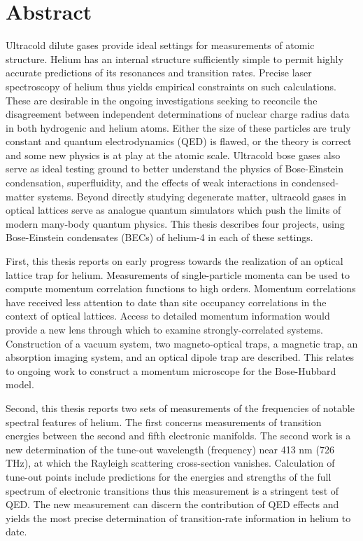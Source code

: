 \section*{Abstract}

Ultracold dilute gases provide ideal settings for measurements of atomic structure. 
Helium has an internal structure sufficiently simple to permit highly accurate predictions of its resonances and transition rates.
Precise laser spectroscopy of helium thus yields empirical constraints on such calculations.
These are desirable in the ongoing investigations seeking to reconcile the disagreement between independent determinations of nuclear charge radius data in both hydrogenic and helium atoms.
Either the size of these particles are truly constant and quantum electrodynamics (QED) is flawed, or the theory is correct and some new physics is at play at the atomic scale.
Ultracold bose gases also serve as ideal testing ground to better understand the physics of Bose-Einstein condensation, superfluidity, and the effects of weak interactions in condensed-matter systems.
Beyond directly studying degenerate matter, ultracold gases in optical lattices serve as analogue quantum simulators which push the limits of modern many-body quantum physics. 
This thesis describes four projects, using Bose-Einstein condensates (BECs) of helium-4 in each of these settings.

First, this thesis reports on early progress towards the realization of an optical lattice trap for helium.
Measurements of single-particle momenta can be used to compute momentum correlation functions to high orders.
Momentum correlations have received less attention to date than site occupancy correlations in the context of optical lattices.
Access to detailed momentum information would provide a new lens through which to examine strongly-correlated systems.
Construction of a vacuum system, two magneto-optical traps, a magnetic trap, an absorption imaging system, and an optical dipole trap are described.
This relates to ongoing work to construct a momentum microscope for the Bose-Hubbard model.

Second, this thesis reports two sets of measurements of the frequencies of notable spectral features of helium.
The first concerns measurements of transition energies between the second and fifth electronic manifolds.
The second work is a new determination of the tune-out wavelength (frequency) near 413 nm (726 THz), at which the Rayleigh scattering cross-section vanishes. 
Calculation of tune-out points include predictions for the energies and strengths of the full spectrum of electronic transitions thus this measurement is a stringent test of QED.
The new measurement can discern the contribution of QED effects and yields the most precise determination of transition-rate information in helium to date.

